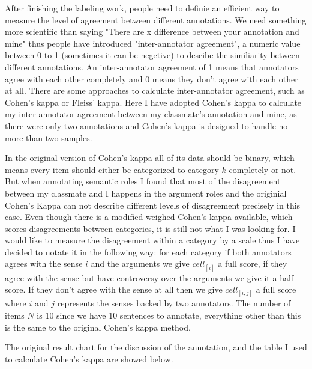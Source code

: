 \documentclass[11pt]{article} %
\begin{document}
After finishing the labeling work, people need to definie an efficient way to measure the level of agreement between different annotations. We need something more scientific than saying "There are x difference between your annotation and mine" thus people have introduced "inter-annotator agreement", a numeric value between 0 to 1 (sometimes it can be negetive) to descibe the similiarity between different annotations. An inter-annotator agreement of 1 means that annotators agree with each other completely and 0 means they don't agree with each other at all. There are some approaches to calculate inter-annotator agreement, such as Cohen's kappa\cite{BibEntry2018Dec} or Fleiss' kappa\cite{BibEntry2018Nov}. Here I have adopted Cohen's kappa to calculate my inter-annotator agreement between my classmate's annotation and mine, as there were only two annotations and Cohen's kappa is designed to handle no more than two samples.

In the original version of Cohen's kappa all of its data should be binary, which means every item should either be categorized to category $k$ completely or not. But when annotating semantic roles I found that most of the disagreement between my classmate and I happens in the argument roles and the originial Cohen's Kappa can not describe different levels of disagreement precisely in this case. Even though there is a modified weighed Cohen's kappa available, which scores disagreements between categories\cite{cohen1968weighted}, it is still not what I was looking for. I would like to measure the disagreement within a category by a scale thus I have decided to notate it in the following way: for each category if both annotators agrees with the sense $i$ and the arguments we give $cell_{[i]}$ a full score, if they agree with the sense but have controversy over the arguments we give it a half score. If they don't agree with the sense at all then we give $cell_{[i, j]}$ a full score where $i$ and $j$ represents the senses backed by two annotators. The number of items $N$ is 10 since we have 10 sentences to annotate, everything other than this is the same to the original Cohen's kappa method.

The original result chart for the discussion of the annotation, and the table I used to calculate Cohen's kappa are showed below.
\end{document}

